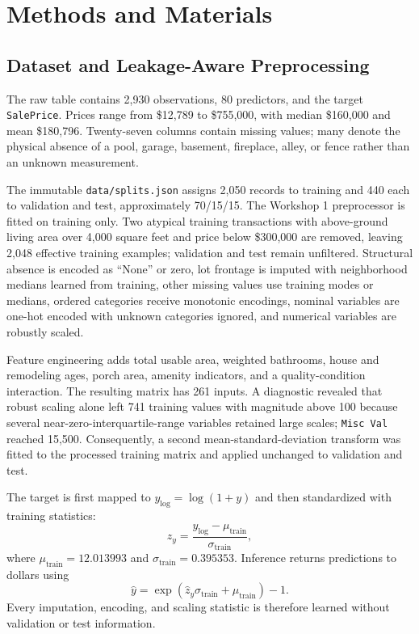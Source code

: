 \documentclass[11pt,a4paper]{article}
\begin{document}
\section{Methods and Materials}

\subsection{Dataset and Leakage-Aware Preprocessing}
The raw table contains 2,930 observations, 80 predictors, and the target \texttt{SalePrice}. Prices range from \$12,789 to \$755,000, with median \$160,000 and mean \$180,796. Twenty-seven columns contain missing values; many denote the physical absence of a pool, garage, basement, fireplace, alley, or fence rather than an unknown measurement.

The immutable \texttt{data/splits.json} assigns 2,050 records to training and 440 each to validation and test, approximately 70/15/15. The Workshop 1 preprocessor is fitted on training only. Two atypical training transactions with above-ground living area over 4,000 square feet and price below \$300,000 are removed, leaving 2,048 effective training examples; validation and test remain unfiltered. Structural absence is encoded as ``None'' or zero, lot frontage is imputed with neighborhood medians learned from training, other missing values use training modes or medians, ordered categories receive monotonic encodings, nominal variables are one-hot encoded with unknown categories ignored, and numerical variables are robustly scaled.

Feature engineering adds total usable area, weighted bathrooms, house and remodeling ages, porch area, amenity indicators, and a quality-condition interaction. The resulting matrix has 261 inputs. A diagnostic revealed that robust scaling alone left 741 training values with magnitude above 100 because several near-zero-interquartile-range variables retained large scales; \texttt{Misc Val} reached 15,500. Consequently, a second mean-standard-deviation transform was fitted to the processed training matrix and applied unchanged to validation and test.

The target is first mapped to $y_{\log}=\log(1+y)$ and then standardized with training statistics:
\begin{equation}
z_y=\frac{y_{\log}-\mu_{\mathrm{train}}}{\sigma_{\mathrm{train}}},
\end{equation}
where $\mu_{\mathrm{train}}=12.013993$ and $\sigma_{\mathrm{train}}=0.395353$. Inference returns predictions to dollars using
\begin{equation}
\hat y=\exp(\hat z_y\sigma_{\mathrm{train}}+\mu_{\mathrm{train}})-1.
\end{equation}
Every imputation, encoding, and scaling statistic is therefore learned without validation or test information.
\end{document}
